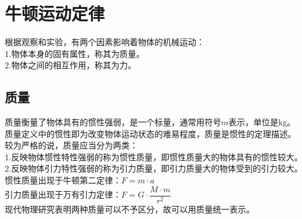 \documentclass[UTF8]{ctexart}
\begin{document}

\newpage

\section{牛顿运动定律}
    根据观察和实验，有两个因素影响着物体的机械运动：\\[3mm]
    1.物体本身的固有属性，称其为质量。\\[3mm]
    2.物体之间的相互作用，称其为力。

\subsection{质量}
    质量衡量了物体具有的惯性强弱，是一个标量，通常用符号$m$表示，单位是\si{kg}。\\[3mm]
    质量定义中的惯性即为改变物体运动状态的难易程度，质量是惯性的定理描述。\\[5mm]
    较为严格的说，质量应当分为两类：\\[3mm]
    1.反映物体惯性特性强弱的称为惯性质量，即惯性质量大的物体具有的惯性较大。\\[3mm]
    2.反映物体引力特性强弱的称为引力质量，即引力质量大的物体受到的引力较大。\\[3mm]
    惯性质量出现于牛顿第二定律：$F=m\cdot a$\\[3mm]
    引力质量出现于万有引力定律：$F=G\cdot \dfrac{M\cdot m}{r^2}$\\[3mm]
    现代物理研究表明两种质量可以不予区分，故可以用质量统一表示。
\end{document}
